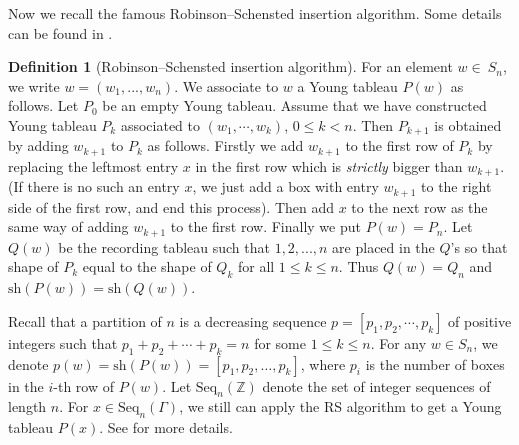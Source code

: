 \documentclass[11pt, reqno]{amsart}
\newtheorem{Thm}{Theorem}[section]
\theoremstyle{definition}
\newtheorem{dfn}[Thm]{Definition}
\numberwithin{equation}{section}
\begin{document}
Now we recall the famous Robinson--Schensted insertion  algorithm. Some details can be found in  \cite{Sagan}.

\begin{dfn}[Robinson--Schensted insertion algorithm]
For an element  $ w\in\ S_n $, we write  $w=(w_1,...,w_n)$. We associate to $w $ a  Young tableau  $ P(w) $ as follows. Let $ P_0 $ be an empty Young tableau. Assume that we have constructed Young tableau $ P_k $ associated to $ (w_1,\cdots,w_k) $, $ 0\leq k<n $. Then $ P_{k+1} $ is obtained by adding $ w_{k+1} $ to $ P_k $ as follows. Firstly we add $ w_{k+1} $ to the first row of $ P_k $ by replacing the leftmost entry $ x $ in the first row which is \textit{strictly} bigger than $ w_{k+1} $.  (If there is no such an entry $ x $, we just add a box with entry $w_{k+1}  $ to the right side of the first row, and end this process). Then add $ x $ to the next row as the same way of adding $w_{k+1} $ to the first row.  Finally we put $P(w)=P_n$.
Let $Q(w)$ be the recording tableau such that $1,2,...,n$ are placed in the $Q$'s so that shape of $P_k$ equal to the shape of $Q_k$ for all $1\leq k\leq n$. Thus $Q(w)=Q_n$ and $\mathrm{sh}(P(w))=\mathrm{sh}(Q(w))$.
\end{dfn}

Recall that  a {partition} of $n$ is a decreasing sequence $p=[p_1, p_2, \cdots, p_k]$ of positive integers such that $p_1+p_2+\cdots+p_k=n$ for some $1\leq k\leq n$.
For any $w\in S_n$, we denote $p(w) = \mathrm{sh}(P(w))=[p_1,p_2,\dots,p_k]$, where $p_i$ is the number of boxes in the $i$-th row of $P(w)$. Let $\mathrm{Seq}_n (\mathbb{Z})$ denote the set of integer sequences of length $n$. For $x\in \mathrm{Seq}_n (\Gamma)$, we still can apply the RS algorithm to get a Young tableau $P(x)$. See \cite{BX} for more details.


\end{document}
